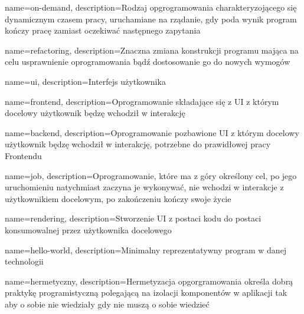 
\makeglossaries


{
    name={on-demand},
    description={Rodzaj opgrogramowania charakteryzojącego się dynamicznym czasem pracy, uruchamiane na rządanie, gdy poda wynik program kończy pracę zamiast oczekiwać następnego zapytania}
}

{
    name={refactoring},
    description={Znaczna zmiana konstrukcji programu mająca na celu usprawnienie oprogramowania bądź dostosowanie go do nowych wymogów}
}

{
    name={ui},
    description={Interfejs użytkownika}
}

{
    name={frontend},
    description={Oprogramowanie składające się z UI z którym docelowy użytkownik będzę wchodził w interakcję}
}

{
    name={backend},
    description={Oprogramowanie pozbawione UI z którym docelowy użytkownik będzę wchodził w interakcję, potrzebne do prawidłowej pracy Frontendu}
}

{
    name={job},
    description={Oprogramowanie, które ma z góry określony cel, po jego uruchomieniu natychmiast zaczyna je wykonywać, nie wchodzi w interakcje z użytkownikiem docelowym, po zakończeniu kończy swoje życie}
}


{
    name={rendering},
    description={Stworzenie UI z postaci kodu do postaci konsumowalnej przez użytkownika docelowego}
}

{
    name={hello-world},
    description={Minimalny reprezentatywny program w danej technologii}
}

{
    name={hermetyczny},
    description={Hermetyzacja opgorgramowania określa dobrą praktykę programistyczną polegającą na izolacji komponentów w aplikacji tak aby o sobie nie wiedziały gdy nie muszą o sobie wiedzieć}
}

